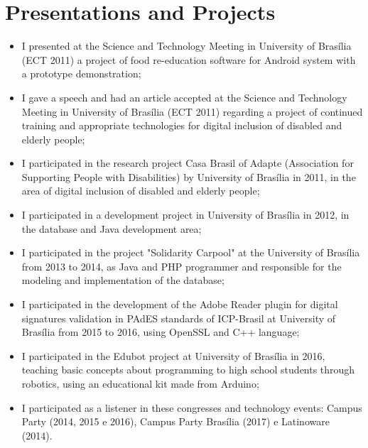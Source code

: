 \section{Presentations and Projects}

\begin{itemize}
    \item I presented at the Science and Technology Meeting in University of Brasília (ECT 2011) a project of food re-education software for Android system with a prototype demonstration;
    \item I gave a speech and had an article accepted at the Science and Technology Meeting in University of Brasília (ECT 2011) regarding a project of continued training and appropriate technologies for digital inclusion of disabled and elderly people; 
    \item I participated in the research project Casa Brasil of Adapte (Association for Supporting People with Disabilities) by University of Brasília in 2011, in the area of digital inclusion of disabled and elderly people;
    \item I participated in a development project in University of Brasília in 2012, in the database and Java development area;
    \item I participated in the project "Solidarity Carpool" at the University of Brasília from 2013 to 2014, as Java and PHP programmer and responsible for the modeling and implementation of the database;
    \item I participated in the development of the Adobe Reader plugin for digital signatures validation in PAdES standards of ICP-Brasil at University of Brasília from 2015 to 2016, using OpenSSL and C++ language;
    \item I participated in the Edubot project at University of Brasília in 2016, teaching basic concepts about programming to high school students through robotics, using an educational kit made from Arduino;
    \item I participated as a listener in these congresses and technology events: Campus Party (2014, 2015 e 2016), Campus Party Brasília (2017) e Latinoware (2014).
\end{itemize}